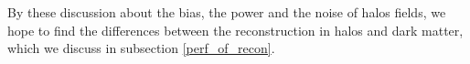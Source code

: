 By these discussion about the bias, the power and the noise of halos
fields, we hope to find the differences between the 
reconstruction in halos and dark matter, which we discuss in subsection
 \ref{perf_of_recon}.
